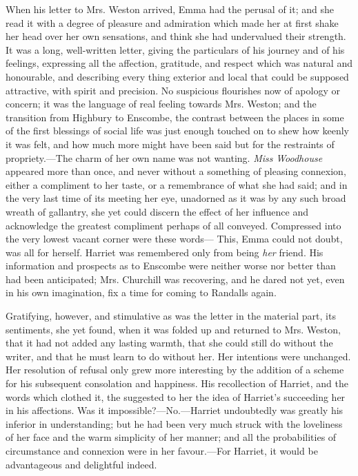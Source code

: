 When his letter to Mrs. Weston arrived, Emma had the perusal of it; and she read it with a degree of pleasure and admiration which made her at first shake her head over her own sensations, and think she had undervalued their strength. It was a long, well-written letter, giving the particulars of his journey and of his feelings, expressing all the affection, gratitude, and respect which was natural and honourable, and describing every thing exterior and local that could be supposed attractive, with spirit and precision. No suspicious flourishes now of apology or concern; it was the language of real feeling towards Mrs. Weston; and the transition from Highbury to Enscombe, the contrast between the places in some of the first blessings of social life was just enough touched on to shew how keenly it was felt, and how much more might have been said but for the restraints of propriety.---The charm of her own name was not wanting. {\em Miss} {\em Woodhouse} appeared more than once, and never without a something of pleasing connexion, either a compliment to her taste, or a remembrance of what she had said; and in the very last time of its meeting her eye, unadorned as it was by any such broad wreath of gallantry, she yet could discern the effect of her influence and acknowledge the greatest compliment perhaps of all conveyed. Compressed into the very lowest vacant corner were these words--- This, Emma could not doubt, was all for herself. Harriet was remembered only from being {\em her} friend. His information and prospects as to Enscombe were neither worse nor better than had been anticipated; Mrs. Churchill was recovering, and he dared not yet, even in his own imagination, fix a time for coming to Randalls again.

Gratifying, however, and stimulative as was the letter in the material part, its sentiments, she yet found, when it was folded up and returned to Mrs. Weston, that it had not added any lasting warmth, that she could still do without the writer, and that he must learn to do without her. Her intentions were unchanged. Her resolution of refusal only grew more interesting by the addition of a scheme for his subsequent consolation and happiness. His recollection of Harriet, and the words which clothed it, the  suggested to her the idea of Harriet's succeeding her in his affections. Was it impossible?---No.---Harriet undoubtedly was greatly his inferior in understanding; but he had been very much struck with the loveliness of her face and the warm simplicity of her manner; and all the probabilities of circumstance and connexion were in her favour.---For Harriet, it would be advantageous and delightful indeed.

